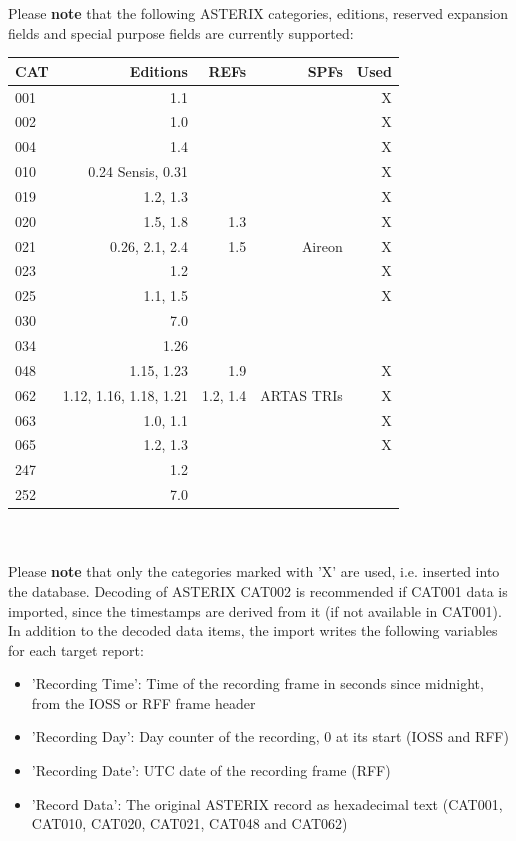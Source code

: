 Please \textbf{note} that the following ASTERIX categories, editions, reserved expansion fields and special purpose fields are currently supported: \\

\begin{tabular}{ | l | r | r | r | r |}
\hline
  CAT & Editions & REFs & SPFs & Used  \\ \hline
  001 & 1.1 & & & X \\ \hline
  002 & 1.0 & & & X  \\ \hline
  004 & 1.4 & & & X  \\ \hline
  010 & 0.24 Sensis, 0.31  &  & & X  \\ \hline
  019 & 1.2, 1.3 & & & X \\ \hline
  020 & 1.5, 1.8 & 1.3 & & X \\ \hline
  021 & 0.26, 2.1, 2.4 & 1.5 & Aireon & X \\ \hline
  023 & 1.2 & & & X \\ \hline
  025 & 1.1, 1.5 & & & X \\ \hline
  030 & 7.0 & & & \\ \hline
  034 & 1.26 & & &  \\ \hline
  048 & 1.15, 1.23 & 1.9 & & X \\ \hline
  062 & 1.12, 1.16, 1.18, 1.21 & 1.2, 1.4 & ARTAS TRIs & X \\ \hline
  063 & 1.0, 1.1 & & & X \\ \hline
  065 & 1.2, 1.3 & & & X \\ \hline
  247 & 1.2 & & & \\ \hline
  252 & 7.0 & & & \\ \hline
\end{tabular} \\
\  \\

Please \textbf{note} that only the categories marked with 'X' are used, i.e. inserted into the database. Decoding of ASTERIX CAT002 is recommended if CAT001 data is imported, since the timestamps are derived from it (if not available in CAT001). \\

In addition to the decoded data items, the import writes the following variables for each target report:

\begin{itemize}
\item 'Recording Time': Time of the recording frame in seconds since midnight, from the IOSS or RFF frame header
\item 'Recording Day': Day counter of the recording, 0 at its start (IOSS and RFF)
\item 'Recording Date': UTC date of the recording frame (RFF)
\item 'Record Data': The original ASTERIX record as hexadecimal text (CAT001, CAT010, CAT020, CAT021, CAT048 and CAT062)
\end{itemize}
\ \\

